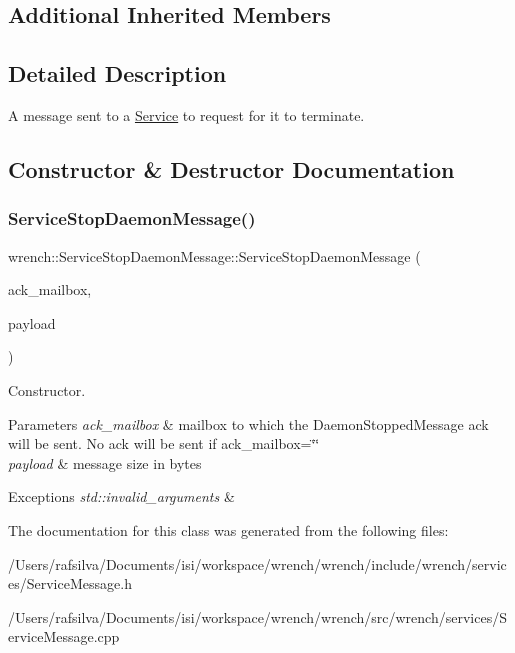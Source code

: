 \subsection*{Additional Inherited Members}


\subsection{Detailed Description}
A message sent to a \hyperlink{classwrench_1_1_service}{Service} to request for it to terminate. 

\subsection{Constructor \& Destructor Documentation}
\mbox{\label{classwrench_1_1_service_stop_daemon_message_a61ec12946b3b303d9e57bb4fcbf654ec}} 
\subsubsection{\texorpdfstring{Service\+Stop\+Daemon\+Message()}{ServiceStopDaemonMessage()}}
{\footnotesize\ttfamily wrench\+::\+Service\+Stop\+Daemon\+Message\+::\+Service\+Stop\+Daemon\+Message (\begin{DoxyParamCaption}\item[{std\+::string}]{ack\+\_\+mailbox,  }\item[{double}]{payload }\end{DoxyParamCaption})}



Constructor. 


\begin{DoxyParams}{Parameters}
{\em ack\+\_\+mailbox} & mailbox to which the Daemon\+Stopped\+Message ack will be sent. No ack will be sent if ack\+\_\+mailbox=\char`\"{}\char`\"{} \\
\hline
{\em payload} & message size in bytes\\
\hline
\end{DoxyParams}

\begin{DoxyExceptions}{Exceptions}
{\em std\+::invalid\+\_\+arguments} & \\
\hline
\end{DoxyExceptions}


The documentation for this class was generated from the following files\+:\begin{DoxyCompactItemize}
\item 
/\+Users/rafsilva/\+Documents/isi/workspace/wrench/wrench/include/wrench/services/Service\+Message.\+h\item 
/\+Users/rafsilva/\+Documents/isi/workspace/wrench/wrench/src/wrench/services/Service\+Message.\+cpp\end{DoxyCompactItemize}
